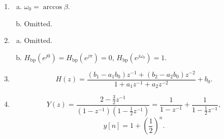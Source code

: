 \documentclass{article}
\begin{document}
\begin{enumerate}
            \item
            \begin{enumerate}[(a)]
                \item $\omega_0 = \arccos \beta$.
                \item Omitted.
            \end{enumerate}

            \item 
            \begin{enumerate}[(a)]
                \item Omitted.
                \item $H_\text{bp} (e^{j 0}) = H_\text{bp}(e^{j\pi}) = 0$, $H_\text{bp}(e^{j\omega_0}) = 1$.
            \end{enumerate}	
            
            \item \[
                H(z) = \frac{(b_1-a_1b_0)z^{-1} + (b_2-a_2b_0)z^{-2}}{1 + a_1z^{-1} + a_2z^{-2}} + b_0.
            \]
            
            \item \[
                Y(z) = \frac{2 - \frac{3}{2}z^{-1}}{(1-z^{-1})(1-\frac{1}{2}z^{-1})}
                = \frac{1}{1-z^{-1}} + \frac{1}{1-\frac{1}{2}z^{-1}},
            \]
            \[
                y[n] = 1 + \left( \frac{1}{2}\right)^{n}.
            \]
        \end{enumerate}
        
\end{document}
